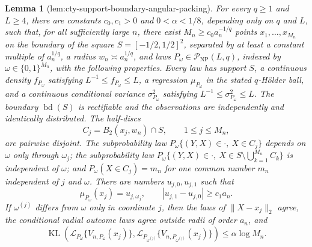 \documentclass{article}
\newtheorem{lemma}{Lemma}
\begin{document}
\begin{lemma}[lem:cty-support-boundary-angular-packing]\label{lem:cty-support-boundary-angular-packing}
For every \(q\geq1\) and \(L\geq4\), there are constants \(c_0,c_1>0\) and \(0<\alpha<1/8\), depending only on \(q\) and \(L\), such that, for all sufficiently large \(n\), there exist \(M_n\geq c_0a_n^{-1/q}\) points \(x_1,\ldots,x_{M_n}\) on the boundary of the square \(S=[-1/2,1/2]^2\), separated by at least a constant multiple of \(a_n^{1/q}\), a radius \(w_n\asymp a_n^{1/q}\), and laws \(P_\omega\in\mathcal P_{\mathrm{NP}}(L,q)\), indexed by \(\omega\in\{0,1\}^{M_n}\), with the following properties.  Every law has support \(S\), a continuous density \(f_{P_\omega}\) satisfying \(L^{-1}\leq f_{P_\omega}\leq L\), a regression \(\mu_{P_\omega}\) in the stated \(q\)-H\"older ball, and a continuous conditional variance \(\sigma^2_{P_\omega}\) satisfying \(L^{-1}\leq\sigma^2_{P_\omega}\leq L\).  The boundary \(\operatorname{bd}(S)\) is rectifiable and the observations are independently and identically distributed.  The half-discs
\[
 C_j=B_2(x_j,w_n)\cap S,\qquad 1\leq j\leq M_n,
\]
are pairwise disjoint.  The subprobability law \(P_\omega\{(Y,X)\in\cdot,\ X\in C_j\}\) depends on \(\omega\) only through \(\omega_j\); the subprobability law \(P_\omega\{(Y,X)\in\cdot,\ X\in S\setminus\bigcup_{k=1}^{M_n}C_k\}\) is independent of \(\omega\); and \(P_\omega(X\in C_j)=m_n\) for one common number \(m_n\) independent of \(j\) and \(\omega\).  There are numbers \(u_{j,0},u_{j,1}\) such that
\[
 \mu_{P_\omega}(x_j)=u_{j,\omega_j},
 \qquad |u_{j,1}-u_{j,0}|\geq c_1a_n.
\]
If \(\omega^{(j)}\) differs from \(\omega\) only in coordinate \(j\), then the laws of \(\lVert X-x_j\rVert_2\) agree, the conditional radial outcome laws agree outside radii of order \(a_n\), and
\[
 \operatorname{KL}\!\left(\mathcal L_{P_\omega}\{V_{n,P_\omega}(x_j)\},
 \mathcal L_{P_{\omega^{(j)}}}\{V_{n,P_{\omega^{(j)}}}(x_j)\}\right)
 \leq\alpha\log M_n.
\]
\end{lemma}
\end{document}
